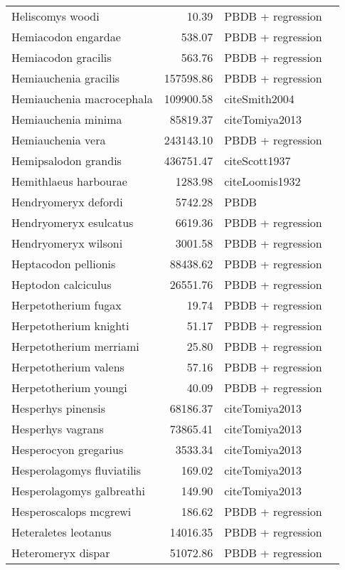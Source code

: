 \begin{table}[ht]
\begin{tabular}{lrll}
  Heliscomys woodi & 10.39 & PBDB + regression &  \\ 
  Hemiacodon engardae & 538.07 & PBDB + regression &  \\ 
  Hemiacodon gracilis & 563.76 & PBDB + regression &  \\ 
  Hemiauchenia gracilis & 157598.86 & PBDB + regression &  \\ 
  Hemiauchenia macrocephala & 109900.58 & cite{Smith2004} &  \\ 
  Hemiauchenia minima & 85819.37 & cite{Tomiya2013} &  \\ 
  Hemiauchenia vera & 243143.10 & PBDB + regression &  \\ 
  Hemipsalodon grandis & 436751.47 & cite{Scott1937} &  \\ 
  Hemithlaeus harbourae & 1283.98 & cite{Loomis1932} &  \\ 
  Hendryomeryx defordi & 5742.28 & PBDB &  \\ 
  Hendryomeryx esulcatus & 6619.36 & PBDB + regression &  \\ 
  Hendryomeryx wilsoni & 3001.58 & PBDB + regression &  \\ 
  Heptacodon pellionis & 88438.62 & PBDB + regression &  \\ 
  Heptodon calciculus & 26551.76 & PBDB + regression &  \\ 
  Herpetotherium fugax & 19.74 & PBDB + regression &  \\ 
  Herpetotherium knighti & 51.17 & PBDB + regression &  \\ 
  Herpetotherium merriami & 25.80 & PBDB + regression &  \\ 
  Herpetotherium valens & 57.16 & PBDB + regression &  \\ 
  Herpetotherium youngi & 40.09 & PBDB + regression &  \\ 
  Hesperhys pinensis & 68186.37 & cite{Tomiya2013} &  \\ 
  Hesperhys vagrans & 73865.41 & cite{Tomiya2013} &  \\ 
  Hesperocyon gregarius & 3533.34 & cite{Tomiya2013} &  \\ 
  Hesperolagomys fluviatilis & 169.02 & cite{Tomiya2013} &  \\ 
  Hesperolagomys galbreathi & 149.90 & cite{Tomiya2013} &  \\ 
  Hesperoscalops mcgrewi & 186.62 & PBDB + regression &  \\ 
  Heteraletes leotanus & 14016.35 & PBDB + regression &  \\ 
  Heteromeryx dispar & 51072.86 & PBDB + regression &  \\ 

\end{tabular}
\end{table}
